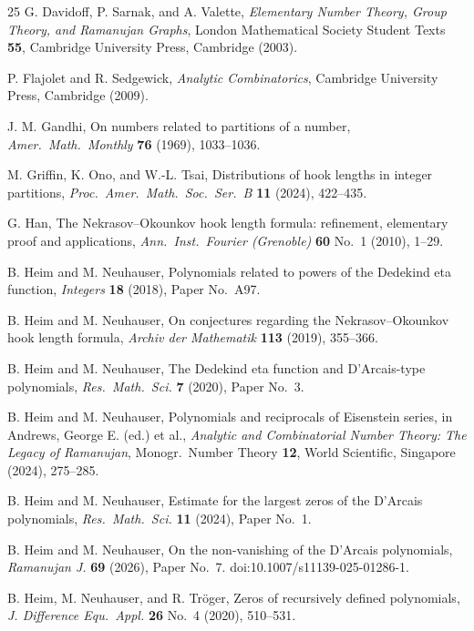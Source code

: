 \documentclass[11pt,reqno]{amsart}
\theoremstyle{plain}
\theoremstyle{remark}
\theoremstyle{definition}
\numberwithin{equation}{section}
\begin{document}
\begin{thebibliography}{25}
G. Davidoff, P. Sarnak, and A. Valette,
\emph{Elementary Number Theory, Group Theory, and Ramanujan Graphs},
London Mathematical Society Student Texts \textbf{55}, Cambridge University Press, Cambridge
(2003).

P. Flajolet and R. Sedgewick,
\emph{Analytic Combinatorics},
Cambridge University Press, Cambridge
(2009).

J. M. Gandhi,
On numbers related to partitions of a number,
\emph{Amer.\ Math.\ Monthly\/} \textbf{76} (1969), 1033--1036.

M. Griffin, K. Ono, and W.-L. Tsai,
Distributions of hook lengths in integer partitions,
\emph{Proc.\ Amer.\ Math.\ Soc.\ Ser.\ B\/} \textbf{11} (2024), 422--435.

 G. Han,
{The Nekrasov--Okounkov hook length formula: refinement, elementary proof and applications},
\emph{Ann.\ Inst.\ Fourier (Grenoble)\/}
\textbf{60}
No.\ 1 (2010), 1--29.

B. Heim and M. Neuhauser,
Polynomials related to powers of the Dedekind eta function,
\emph{Integers\/} \textbf{18} (2018), Paper No.\ A97.

B. Heim and M. Neuhauser,
On conjectures regarding the Nekrasov--Okounkov hook length formula,
\emph{Archiv der Mathematik\/}
\textbf{113} (2019), 355--366.

B. Heim and M. Neuhauser,
The Dedekind eta function and D'Arcais-type polynomials,
\emph{Res.\ Math.\ Sci.\/} \textbf{7} (2020), Paper No.\ 3.

B. Heim and M. Neuhauser,
Polynomials and reciprocals of Eisenstein series,
in Andrews, George E. (ed.) et al.,
\emph{Analytic and Combinatorial Number Theory: The Legacy of Ramanujan\/},
Monogr.\ Number Theory \textbf{12}, World Scientific, Singapore
(2024), 275--285.

B. Heim and M. Neuhauser,
Estimate for the largest zeros of the D'Arcais polynomials,
\emph{Res.\ Math.\ Sci.\/} \textbf{11} (2024), Paper No.\
1.

B. Heim and M. Neuhauser,
On the non-vanishing of the D'Arcais polynomials,
\emph{Ramanujan J.\/} \textbf{69}
(2026), Paper No.\ 7.
doi:10.1007/s11139-025-01286-1.


B. Heim, M. Neuhauser, and R. Tr\"oger,
Zeros of recursively defined polynomials,
\emph{J. Difference Equ.\ Appl.\/} \textbf{26} No.\ 4 (2020),
510--531.


\end{thebibliography}
\end{document}
